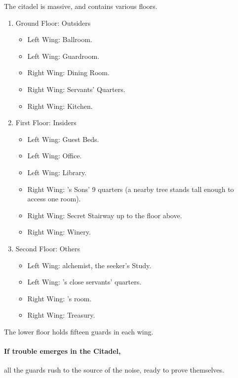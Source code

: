 \begin{multicols}{2}
The citadel is massive, and contains various floors.

\begin{enumerate}
  \item{Ground Floor: Outsiders}
    \begin{itemize}
      \item{Left Wing: Ballroom.}
      \item
      Left Wing: Guardroom.
      \item
      Right Wing: Dining Room.
      \item
      Right Wing: Servants' Quarters.
      \item
      Right Wing: Kitchen.
    \end{itemize}
  \item{First Floor: Insiders}
    \begin{itemize}
      \item
      Left Wing: Guest Beds.
      \item
      Left Wing: Office.
      \item
      Left Wing: Library.
      \item
      Right Wing: 's Sons' 9 quarters (a nearby tree stands tall enough to access one room).
      \item
      Right Wing: Secret Stairway up to the floor above.
      \item
      Right Wing: Winery.
    \end{itemize}
  \item
  Second Floor: Others
    \begin{itemize}
      \item
      Left Wing: \gls{alchemist}, the \gls{seeker}'s Study.
      \item
      Left Wing: 's close servants' quarters.
      \item
      Right Wing: 's room.
      \item
      Right Wing: Treasury.
    \end{itemize}
\end{enumerate}

The lower floor holds fifteen guards in each wing.


\paragraph{If trouble emerges in the Citadel,}
all the guards rush to the source of the noise, ready to prove themselves.


\end{multicols}
